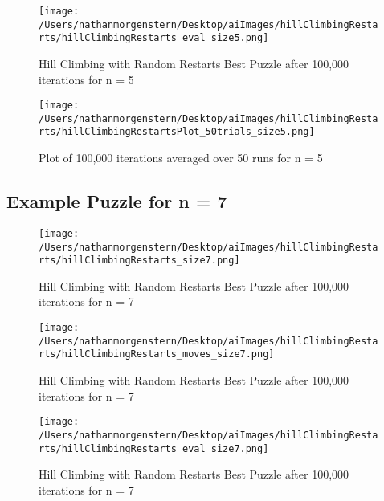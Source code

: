 \documentclass{report}
\begin{document}
	\begin{figure}[H]
	\centering
	\texttt{[image: /Users/nathanmorgenstern/Desktop/aiImages/hillClimbingRestarts/hillClimbingRestarts\_eval\_size5.png]}
	\caption{Hill Climbing with Random Restarts Best Puzzle after 100,000 iterations for n = 5} 
	\label{fig: Hill Climbing with Random Restarts Best Puzzle after 100,000 iterations for n = 5}
	\end{figure}

	\begin{figure}[H]
	\centering
	\texttt{[image: /Users/nathanmorgenstern/Desktop/aiImages/hillClimbingRestarts/hillClimbingRestartsPlot\_50trials\_size5.png]}
	\caption{Plot of 100,000 iterations averaged over 50 runs for n = 5}
	\label{fig: Plot of 100,000 iterations averaged over 50 runs for n = 5}
	\end{figure}

\subsection{Example Puzzle for n = 7}

	\begin{figure}[H]
	\centering
	\texttt{[image: /Users/nathanmorgenstern/Desktop/aiImages/hillClimbingRestarts/hillClimbingRestarts\_size7.png]}
	\caption{Hill Climbing with Random Restarts Best Puzzle after 100,000 iterations for n = 7} 
	\label{fig: Hill Climbing with Random Restarts Best Puzzle after 100,000 iterations for n = 7}
	\end{figure}
	
	\begin{figure}[H]
	\centering
	\texttt{[image: /Users/nathanmorgenstern/Desktop/aiImages/hillClimbingRestarts/hillClimbingRestarts\_moves\_size7.png]}
	\caption{Hill Climbing with Random Restarts Best Puzzle after 100,000 iterations for n = 7} 
	\label{fig: Hill Climbing with Random Restarts Best Puzzle after 100,000 iterations for n = 7}
	\end{figure}

	\begin{figure}[H]
	\centering
	\texttt{[image: /Users/nathanmorgenstern/Desktop/aiImages/hillClimbingRestarts/hillClimbingRestarts\_eval\_size7.png]}
	\caption{Hill Climbing with Random Restarts Best Puzzle after 100,000 iterations for n = 7} 
	\label{fig: Hill Climbing with Random Restarts Best Puzzle after 100,000 iterations for n = 7}
	\end{figure}
\end{document}
